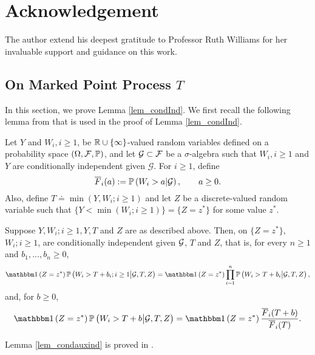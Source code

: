 \documentclass{article}
\numberwithin{equation}{section}
\begin{document}
\section*{Acknowledgement} The author extend his deepest gratitude to Professor Ruth Williams for her invaluable support and guidance on this work.



\begin{appendices}


\section{On Marked Point Process $T$}\label{apx_mpp}

In this section, we prove Lemma \ref{lem_condInd}.  We first  recall the following lemma from \cite{AghRam17} that is used in the proof of Lemma \ref{lem_condInd}.


Let $Y$ and $W_i,i\geq 1$, be $\mathbb{R}\cup\{\infty\}$-valued random variables defined on a probability space $(\Omega,\mathcal{F},\mathbb{P})$, and let $\cal G\subset\cal F$ be a $\sigma$-algebra such that $W_i,i\geq1$ and $Y$ are conditionally independent given $\mathcal{G}$. For $i\geq1$, define
\[ \overline F_i(a) := \mathbb{P}\left(W_i>a|\cal G\right),  \quad\quad  a \geq 0. \]
Also, define $T\doteq \min(Y,W_i;i\geq1)$ and let $Z$ be a discrete-valued random variable such that $\{Y<\min(W_i;i\geq1)\}=\{Z= z^*\}$ for some value $z^*$.  

\begin{lemma}\label{lem_condauxind}
Suppose $Y, W_i; i\geq1,Y,T$ and $Z$ are as described above. Then, on $\{Z=z^*\}$,  $W_i;i\geq1$, are  conditionally independent given $\cal G$, $T$ and $Z$, that is, for every $n\geq1$ and $b_1,...,b_n\geq0$,
\begin{equation}\label{condAuxInd}
   \indic{Z=z^*}\Prob{W_i>T+b_i;i\geq 1 \big| \mathcal{G},T,Z}=   \indic{Z=z^*}\prod_{i=1}^n\Prob{W_i>T+b_i\big| \mathcal{G},T,Z},
\end{equation}
and,  for $b \geq 0$,
\begin{equation}\label{condAuxDist}
     \indic{Z=z^*}\Prob{W_i>T+b\big| \mathcal{G},T,Z} = \indic{Z=z^*}\frac{\overline F_i(T+b)}{\overline F_i(T)}.
\end{equation}
\end{lemma}

Lemma \ref{lem_condauxind} is proved in \cite[Lemma A.5]{AghRam17}.



\end{appendices}
\end{document}
